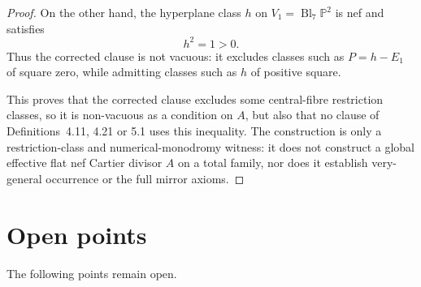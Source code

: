 \documentclass[12pt]{article}
\theoremstyle{plain}
\theoremstyle{definition}
\DeclareMathOperator{\Bl}{Bl}
\newcommand{\bP}{\mathbb{P}}
\begin{document}
\begin{proof}
On the other hand, the hyperplane class $h$ on $V_1=\Bl_7\bP^2$ is nef and satisfies
\[
h^2=1>0.
\]
Thus the corrected clause is not vacuous: it excludes classes such as $P=h-E_1$ of square zero, while admitting classes such as $h$ of positive square.

This proves that the corrected clause excludes some central-fibre restriction classes, so it is non-vacuous as a condition on $A$, but also that no clause of Definitions~4.11, 4.21 or 5.1 uses this inequality.  The construction is only a restriction-class and numerical-monodromy witness: it does not construct a global effective flat nef Cartier divisor $A$ on a total family, nor does it establish very-general occurrence or the full mirror axioms.
\end{proof}

\section{Open points}

The following points remain open.
\end{document}

